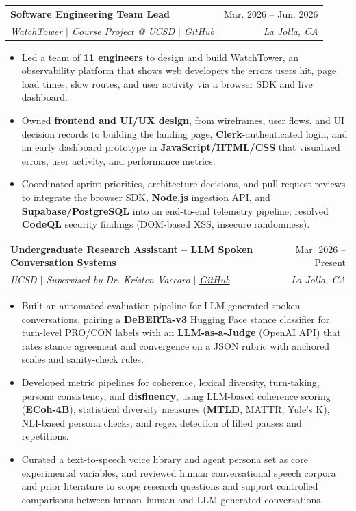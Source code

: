 \documentclass[letterpaper,11pt]{article}
\makeatletter
\newcommand{\resumeItem}[1]{
  \item\small{
    {#1 \vspace{-2pt}}
  }
}
\newcommand{\resumeSubheading}[4]{
  \vspace{-2pt}\item
    \begin{tabular*}{0.97\textwidth}[t]{l@{\extracolsep{\fill}}r}
      \textbf{#1} & #2 \\
      \textit{\small#3} & \textit{\small #4} \\
    \end{tabular*}\vspace{-7pt}
}
\newcommand{\ghlink}[1]{\href{#1}{\underline{GitHub}}}
\newcommand{\resumeItemListStart}{\begin{itemize}}
\newcommand{\resumeItemListEnd}{\end{itemize}\vspace{-5pt}}
\makeatother
\begin{document}
\resumeSubheading
  {Software Engineering Team Lead}
  {Mar. 2026 -- Jun. 2026}
  {WatchTower $|$ Course Project @ UCSD $|$ \ghlink{https://github.com/cse110-sp26-group09/Watchtower-Course-Project}}
  {La Jolla, CA}
  \resumeItemListStart
    \resumeItem{Led a team of \textbf{11 engineers} to design and build WatchTower, an observability platform that shows web developers the errors users hit, page load times, slow routes, and user activity via a browser SDK and live dashboard.}
    \resumeItem{Owned \textbf{frontend and UI/UX design}, from wireframes, user flows, and UI decision records to building the landing page, \textbf{Clerk}-authenticated login, and an early dashboard prototype in \textbf{JavaScript/HTML/CSS} that visualized errors, user activity, and performance metrics.}
    \resumeItem{Coordinated sprint priorities, architecture decisions, and pull request reviews to integrate the browser SDK, \textbf{Node.js} ingestion API, and \textbf{Supabase/PostgreSQL} into an end-to-end telemetry pipeline; resolved \textbf{CodeQL} security findings (DOM-based XSS, insecure randomness).}
  \resumeItemListEnd
\resumeSubheading
  {Undergraduate Research Assistant -- LLM Spoken Conversation Systems}
  {Mar. 2026 -- Present}
  {UCSD $|$ Supervised by Dr. Kristen Vaccaro $|$ \ghlink{https://github.com/jsnsnydr/ecm}}
  {La Jolla, CA}
  \resumeItemListStart
    \resumeItem{Built an automated evaluation pipeline for LLM-generated spoken conversations, pairing a \textbf{DeBERTa-v3} Hugging Face stance classifier for turn-level PRO/CON labels with an \textbf{LLM-as-a-Judge} (OpenAI API) that rates stance agreement and convergence on a JSON rubric with anchored scales and sanity-check rules.}
    \resumeItem{Developed metric pipelines for coherence, lexical diversity, turn-taking, persona consistency, and \textbf{disfluency}, using LLM-based coherence scoring (\textbf{ECoh-4B}), statistical diversity measures (\textbf{MTLD}, MATTR, Yule's K), NLI-based persona checks, and regex detection of filled pauses and repetitions.}
    \resumeItem{Curated a text-to-speech voice library and agent persona set as core experimental variables, and reviewed human conversational speech corpora and prior literature to scope research questions and support controlled comparisons between human--human and LLM-generated conversations.}
  \resumeItemListEnd
\end{document}
